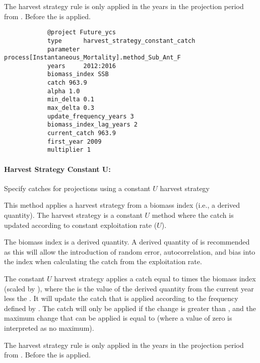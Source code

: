 The harvest strategy rule is only applied in the years in the projection period from . Before  the  is applied.

{\small{\begin{verbatim}
			@project Future_ycs
			type      harvest_strategy_constant_catch
			parameter process[Instantaneous_Mortality].method_Sub_Ant_F
			years     2012:2016
			biomass_index SSB
			catch 963.9
			alpha 1.0
			min_delta 0.1
			max_delta 0.3
			update_frequency_years 3
			biomass_index_lag_years 2
			current_catch 963.9
			first_year 2009
			multiplier 1
\end{verbatim}}}

\paragraph[HarvestStrategyConstantU]{Harvest Strategy Constant U:} Specify catches for projections using a constant $U$ harvest strategy  \label{sec:Project-HarvestStrategyConstantU} 

This method applies a harvest strategy from a biomass index (i.e., a derived quantity). The harvest strategy is a constant $U$ method where the catch is updated according to constant exploitation rate ($U$).

The biomass index is a derived quantity. A derived quantity of  is recommended as this will allow the introduction of random error, autocorrelation, and bias into the index when calculating the catch from the exploitation rate.

The constant $U$ harvest strategy applies a catch equal to  times the biomass index (scaled by ), where the  is the value of the derived quantity from the current year less the . It will update the catch that is applied according to the frequency defined by . The catch will only be applied if the change is greater than , and the maximum change that can be applied is equal to  (where a value of zero is interpreted as no maximum). 

The harvest strategy rule is only applied in the years in the projection period from . Before  the  is applied.

